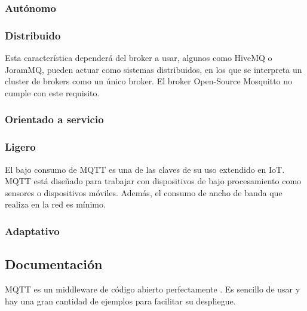 \documentclass[12pt, twoside]{book}
\newcommand{\MYhref}[3][blue]{\href{#2}{\color{#1}{#3}}}
\begin{document}
\subsubsection*{Autónomo}

\subsubsection*{Distribuido}
Esta característica dependerá del broker a usar, algunos como HiveMQ o JoramMQ, pueden actuar como sistemas distribuidos, en los que se interpreta un cluster de brokers como un único broker.
El broker Open-Source Mosquitto no cumple con este requisito.
\subsubsection*{Orientado a servicio}

\subsubsection*{Ligero}
El bajo consumo de MQTT es una de las claves de su uso extendido en IoT. MQTT está diseñado para trabajar con dispositivos de bajo procesamiento como sensores o dispositivos móviles. Además, el consumo de ancho de banda que realiza en la red es mínimo. 

\subsubsection*{Adaptativo}

\subsection{Documentación}
MQTT es un middleware de código abierto perfectamente
\MYhref{http://docs.oasis-open.org/mqtt/mqtt/v3.1.1/mqtt-v3.1.1.html}{documentado}. Es sencillo de usar y hay una gran cantidad de ejemplos para facilitar su despliegue.\\

 
\end{document}
